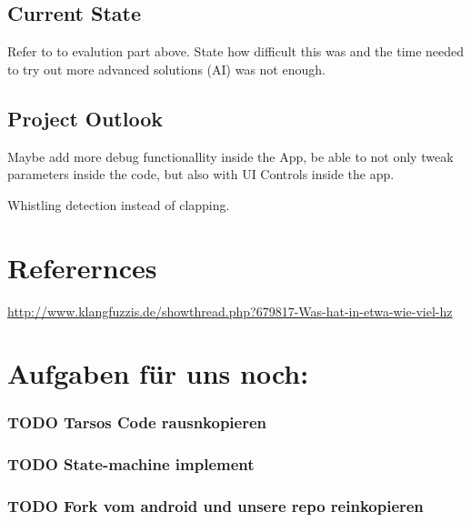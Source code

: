 \documentclass
[
 12pt, %
       DIV12,
       a4paper,
       oneside,
       titlepage,
       parskip=half,
       headings=normal,
       listof=totoc,
       bibliography=totoc,
       index=totoc,
       captions=tableheading,
       ]{scrreprt}
\begin{document}
\section{Current State}
\label{sec:orgaa87f52}
Refer to to evalution part above. State how difficult this was and the time
needed to try out more advanced solutions (AI) was not enough.

\section{Project Outlook}
\label{sec:org3104bbe}
Maybe add more debug functionallity inside the App, be able to not only tweak
parameters inside the code, but also with UI Controls inside the app.

Whistling detection instead of clapping.







\chapter{Referernces}
\label{sec:orgb9bf40c}
\url{http://www.klangfuzzis.de/showthread.php?679817-Was-hat-in-etwa-wie-viel-hz}

\chapter{Aufgaben für uns noch:}
\label{sec:org01bd020}
\subsection{{\bfseries\sffamily TODO} Tarsos Code rausnkopieren}
\label{sec:orgcaf13d7}
\subsection{{\bfseries\sffamily TODO} State-machine implement}
\label{sec:orgf77b6e7}
\subsection{{\bfseries\sffamily TODO} Fork vom android und unsere repo reinkopieren}
\label{sec:org6cdb27c}
\end{document}
